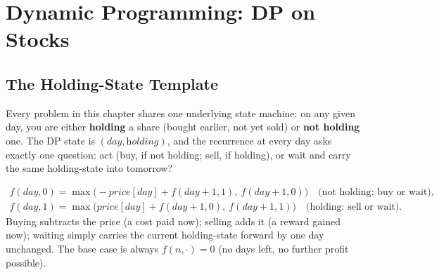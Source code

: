 \chapter{Dynamic Programming: DP on Stocks}

\section{The Holding-State Template}
\label{sec:dp-stocks-intro}

Every problem in this chapter shares one underlying state machine: on
any given day, you are either \textbf{holding} a share (bought earlier,
not yet sold) or \textbf{not holding} one. The DP state is
$(\textit{day}, \textit{holding})$, and the recurrence at every day asks
exactly one question: act (buy, if not holding; sell, if holding), or
wait and carry the same holding-state into tomorrow?

\begin{ideabox}
\begin{gather*}
  f(\textit{day}, 0) = \max\big(-\textit{price}[\textit{day}] +
  f(\textit{day}{+}1, 1),\ f(\textit{day}{+}1, 0)\big)
  \quad \text{(not holding: buy or wait)}, \\
  f(\textit{day}, 1) = \max\big(\textit{price}[\textit{day}] +
  f(\textit{day}{+}1, 0),\ f(\textit{day}{+}1, 1)\big)
  \quad \text{(holding: sell or wait)}.
\end{gather*}
Buying subtracts the price (a cost paid now); selling adds it (a
reward gained now); waiting simply carries the current holding-state
forward by one day unchanged. The base case is always
$f(n, \cdot) = 0$ (no days left, no further profit possible).
\end{ideabox}

